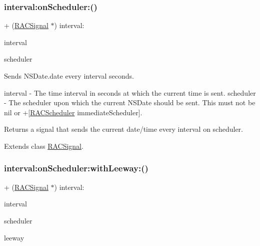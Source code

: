 \subsubsection{\texorpdfstring{interval\+:on\+Scheduler\+:()}{interval:onScheduler:()}\hspace{0.1cm}{\footnotesize\ttfamily [3/3]}}
{\footnotesize\ttfamily + (\mbox{\hyperlink{interface_r_a_c_signal}{R\+A\+C\+Signal}} $\ast$) interval\+: \begin{DoxyParamCaption}\item[{(N\+S\+Time\+Interval)}]{interval }\item[{onScheduler:(\mbox{\hyperlink{interface_r_a_c_scheduler}{R\+A\+C\+Scheduler}} $\ast$)}]{scheduler }\end{DoxyParamCaption}}

Sends N\+S\+Date.\+date every {\ttfamily interval} seconds.

interval -\/ The time interval in seconds at which the current time is sent. scheduler -\/ The scheduler upon which the current N\+S\+Date should be sent. This must not be nil or +\mbox{[}\mbox{\hyperlink{interface_r_a_c_scheduler}{R\+A\+C\+Scheduler}} immediate\+Scheduler\mbox{]}.

Returns a signal that sends the current date/time every {\ttfamily interval} on {\ttfamily scheduler}. 

Extends class \mbox{\hyperlink{interface_r_a_c_signal_a65442f423ebf08b9217f7bb206780a45}{R\+A\+C\+Signal}}.

\mbox{\label{category_r_a_c_signal_07_operations_08_acd968c129ec1afe3b5bc77db5fc13291}} 
\subsubsection{\texorpdfstring{interval\+:on\+Scheduler\+:with\+Leeway\+:()}{interval:onScheduler:withLeeway:()}\hspace{0.1cm}{\footnotesize\ttfamily [1/3]}}
{\footnotesize\ttfamily + (\mbox{\hyperlink{interface_r_a_c_signal}{R\+A\+C\+Signal}} $\ast$) interval\+: \begin{DoxyParamCaption}\item[{(N\+S\+Time\+Interval)}]{interval }\item[{onScheduler:(\mbox{\hyperlink{interface_r_a_c_scheduler}{R\+A\+C\+Scheduler}} $\ast$)}]{scheduler }\item[{withLeeway:(N\+S\+Time\+Interval)}]{leeway }\end{DoxyParamCaption}}

